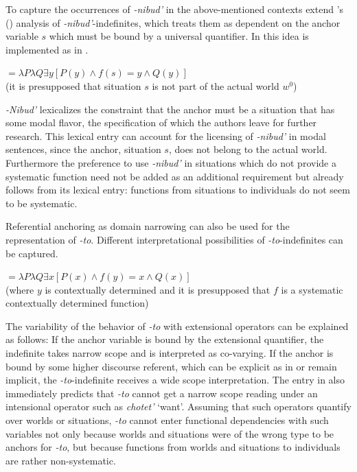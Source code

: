\documentclass[output=paper,colorlinks,citecolor=brown]{langscibook}
\begin{document}
\noindent To capture the occurrences of \textit{-nibud’} in the above-mentioned contexts \citeauthor{Onea.Geist2011} extend \citeauthor{Yanovich2005}'s (\citeyear{Yanovich2005}) analysis of \textit{-nibud’}-indefinites, which treats them as dependent on the anchor variable $s$ which must be bound by a universal quantifier. In \citet{Onea.Geist2011} this idea is implemented as in .

\ea {}${}=\lambda P\lambda Q\exists y[P(y)\wedge f(s)=y\wedge Q(y)]$\smallskip\\
(it is presupposed that situation $s$ is not part of the actual world $w^0$)\\\hfill\citep[222]{Onea.Geist2011}
\label{geist:ex:onea-geist-nibud}
\z 

\noindent \textit{-Nibud’} lexicalizes the constraint that the anchor must be a situation that has some modal flavor, the specification of which the authors leave for further research. This lexical entry can account for the licensing of \textit{-nibud’} in modal sentences, since the anchor, situation $s$, does not belong to the actual world. Furthermore the preference to use \textit{-nibud’} in situations which do not provide a systematic function need not be added as an additional requirement but already follows from its lexical entry: functions from situations to individuals do not seem to be systematic.

Referential anchoring as domain narrowing can also be used for the representation of \textit{-to}. Different interpretational possibilities of \textit{-to}-indefinites can be captured.

\ea {}${}=\lambda P\lambda Q\exists x[P(x)\wedge f(y)=x\wedge Q(x)]$\smallskip\\
(where $y$ is contextually determined and it is presupposed that $f$ is a systematic contextually determined function)\\\hfill\citep[221]{Onea.Geist2011}
\label{geist:ex:onea-geist-to}
\z

\noindent The variability of the behavior of \textit{-to} with extensional operators can be explained as follows: If the anchor variable is bound by the extensional quantifier, the indefinite takes narrow scope and is interpreted as co-varying. If the anchor is bound by some higher discourse referent, which can be explicit as in  or remain implicit, the \textit{-to}-indefinite receives a wide scope interpretation. The entry in  also immediately predicts that \textit{-to} cannot get a narrow scope reading under an intensional operator such as \textit{chotet’} ‘want’. Assuming that such operators quantify over worlds or situations, \textit{-to} cannot enter functional dependencies with such variables not only because worlds and situations were of the wrong type to be anchors for \textit{-to}, but because functions from worlds and situations to individuals are rather non-systematic.
\end{document}
